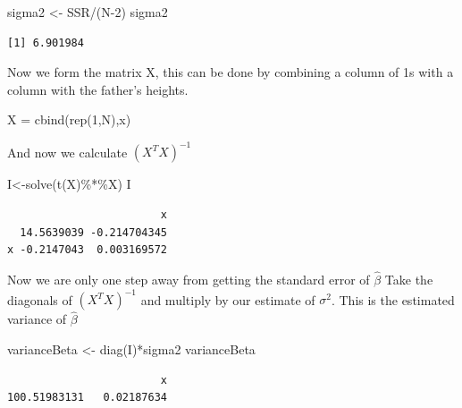 \documentclass[
  letterpaper,
  DIV=11,
  numbers=noendperiod]{scrartcl}
\newenvironment{Shaded}{\begin{snugshade}}{\end{snugshade}}
\newcommand{\DecValTok}[1]{\textcolor[rgb]{0.68,0.00,0.00}{#1}}
\newcommand{\FunctionTok}[1]{\textcolor[rgb]{0.28,0.35,0.67}{#1}}
\newcommand{\NormalTok}[1]{\textcolor[rgb]{0.00,0.23,0.31}{#1}}
\newcommand{\OtherTok}[1]{\textcolor[rgb]{0.00,0.23,0.31}{#1}}
\newcommand{\SpecialCharTok}[1]{\textcolor[rgb]{0.37,0.37,0.37}{#1}}
\begin{document}
\begin{Shaded}
\begin{Highlighting}[]
\NormalTok{sigma2 }\OtherTok{\textless{}{-}}\NormalTok{ SSR}\SpecialCharTok{/}\NormalTok{(N}\DecValTok{{-}2}\NormalTok{)}
\NormalTok{sigma2}
\end{Highlighting}
\end{Shaded}

\begin{verbatim}
[1] 6.901984
\end{verbatim}

Now we form the matrix X, this can be done by combining a column of 1s
with a column with the father's heights.

\begin{Shaded}
\begin{Highlighting}[]
\NormalTok{X }\OtherTok{=} \FunctionTok{cbind}\NormalTok{(}\FunctionTok{rep}\NormalTok{(}\DecValTok{1}\NormalTok{,N),x)}
\end{Highlighting}
\end{Shaded}

And now we calculate \((X^TX)^{-1}\)

\begin{Shaded}
\begin{Highlighting}[]
\NormalTok{I}\OtherTok{\textless{}{-}}\FunctionTok{solve}\NormalTok{(}\FunctionTok{t}\NormalTok{(X)}\SpecialCharTok{\%*\%}\NormalTok{X)}
\NormalTok{I}
\end{Highlighting}
\end{Shaded}

\begin{verbatim}
                        x
  14.5639039 -0.214704345
x -0.2147043  0.003169572
\end{verbatim}

Now we are only one step away from getting the standard error of
\(\hat{\beta}\) Take the diagonals of \((X^TX)^{-1}\) and multiply by
our estimate of \(\sigma^2\). This is the estimated variance of
\(\hat{\beta}\)

\begin{Shaded}
\begin{Highlighting}[]
\NormalTok{varianceBeta }\OtherTok{\textless{}{-}} \FunctionTok{diag}\NormalTok{(I)}\SpecialCharTok{*}\NormalTok{sigma2}
\NormalTok{varianceBeta}
\end{Highlighting}
\end{Shaded}

\begin{verbatim}
                        x 
100.51983131   0.02187634 
\end{verbatim}
\end{document}
